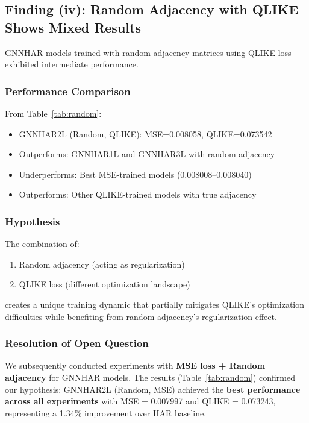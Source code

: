 \documentclass[10pt,a4paper]{article}
\begin{document}
\subsection{Finding (iv): Random Adjacency with QLIKE Shows Mixed Results}

GNNHAR models trained with random adjacency matrices using QLIKE loss exhibited intermediate performance.

\subsubsection{Performance Comparison}

From Table~\ref{tab:random}:
\begin{itemize}
\item GNNHAR2L (Random, QLIKE): MSE=0.008058, QLIKE=0.073542
\item Outperforms: GNNHAR1L and GNNHAR3L with random adjacency
\item Underperforms: Best MSE-trained models (0.008008--0.008040)
\item Outperforms: Other QLIKE-trained models with true adjacency
\end{itemize}

\subsubsection{Hypothesis}

The combination of:
\begin{enumerate}
\item Random adjacency (acting as regularization)
\item QLIKE loss (different optimization landscape)
\end{enumerate}

creates a unique training dynamic that partially mitigates QLIKE's optimization difficulties while benefiting from random adjacency's regularization effect.

\subsubsection{Resolution of Open Question}

We subsequently conducted experiments with \textbf{MSE loss + Random adjacency} for GNNHAR models. The results (Table~\ref{tab:random}) confirmed our hypothesis: GNNHAR2L (Random, MSE) achieved the \textbf{best performance across all experiments} with MSE = 0.007997 and QLIKE = 0.073243, representing a 1.34\% improvement over HAR baseline.
\end{document}
